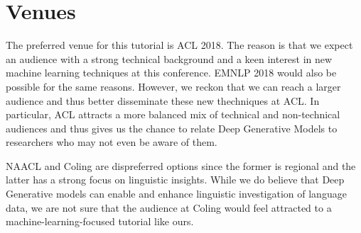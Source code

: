 \section{Venues}

The preferred venue for this tutorial is ACL 2018. The reason is that we expect an audience with
a strong technical background and a keen interest in new machine learning techniques at this conference.
EMNLP 2018 would also be possible for the same reasons. However, we reckon that we can reach a larger
audience and thus better disseminate these new thechniques at ACL. In particular, ACL attracts 
a more balanced mix of technical and non-technical audiences and thus gives us the chance to relate
Deep Generative Models to researchers who may not even be aware of them.

NAACL and Coling are dispreferred options since the former is regional and the latter has a strong
focus on linguistic insights. While we do believe that Deep Generative models can enable and
enhance linguistic investigation of language data, we are not sure that the audience at 
Coling would feel attracted to a machine-learning-focused tutorial like ours. 